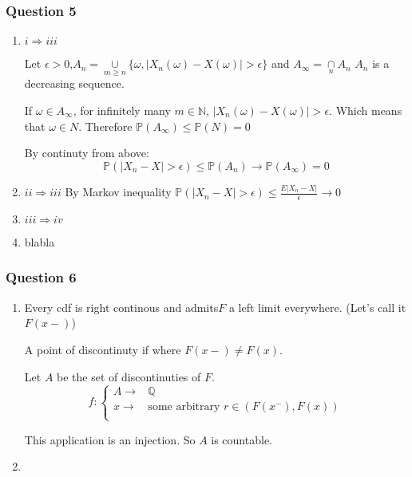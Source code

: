 \documentclass[12pt]{article}
\newcommand{\Q}[1]{\subsubsection*{Question #1}}
\newcommand{\union}[1]{\underset{#1}{\cup} }
\newcommand{\inter}[1]{\underset{#1}{\cap} }
\begin{document}
\Q{5}
\begin{enumerate}
\item $i \Rightarrow iii$


Let $\epsilon > 0$,$A_n = \union{m \geq n} \{ \omega , |X_n(\omega) - X(\omega)| > \epsilon\}$
and $A_{\infty} = \inter{n} A_n$
$A_n$ is a decreasing sequence.

If $\omega \in A_\infty$, 
for infinitely many $m \in \mathbb{N}$, 
$|X_n(\omega) - X(\omega)| > \epsilon$. 
Which means that $\omega \in N$. Therefore $\mathbb{P}(A_\infty) \leq \mathbb{P}(N) = 0$


By continuty from above:
$$\mathbb{P}(|X_n - X| > \epsilon) \leq \mathbb{P}(A_n) \rightarrow \mathbb{P}(A_\infty) = 0$$


\item $ii \Rightarrow iii$
By Markov inequality
$\mathbb{P}(|X_n - X| > \epsilon) \leq \frac{E{|X_n - X|}}{\epsilon} \rightarrow 0$


\item $iii \Rightarrow iv$ 

\item blabla
\end{enumerate}


\Q{6}
\begin{enumerate}

\item
Every cdf is right continous and admits$F$ a left limit everywhere. (Let's call it $F(x-)$)

A point of discontinuty if where $F(x-) \neq F(x)$.


Let $A$ be the set of discontinuties of $F$.
\[
f: \left\{ 
\begin{array}{cc}
      A \rightarrow &\mathbb{Q}\\
      x \rightarrow &\text{some arbitrary } r \in (F(x^-), F(x))\\
\end{array}
\right.
\]


This application is an injection. So $A$ is countable.

\item
\end{enumerate}
\end{document}
